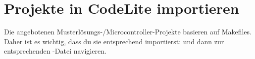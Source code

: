 \section*{Projekte in CodeLite importieren}

Die angebotenen Musterlösungs-/Microcontroller-Projekte basieren auf Makefiles.
Daher ist es wichtig, dass du sie entsprechend importierst:  und dann zur entsprechenden -Datei navigieren.
